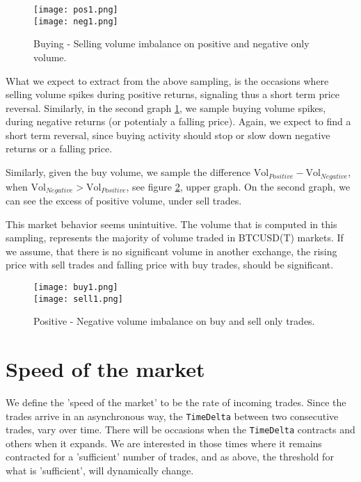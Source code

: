 \begin{figure}[H]
	\centering
    \texttt{[image: pos1.png]} \\
    \texttt{[image: neg1.png]}
	\caption{Buying - Selling volume imbalance on positive and negative only volume.}
    \label{fig:pos_neg}
\end{figure}

What we expect to extract from the above sampling, is the occasions where selling volume spikes during positive returns, signaling thus a short term price reversal. Similarly, in the second graph \ref{fig:pos_neg}, we sample buying volume spikes, during negative returns (or potentialy a falling price). Again, we expect to find a short term reversal, since buying activity should stop or slow down negative returns or a falling price.

Similarly, given the buy volume, we sample the difference  \(\text{Vol}_{Positive} - \text{Vol}_{Negative} \), when \(\text{Vol}_{Negative} > \text{Vol}_{Positive} \), see figure \ref{fig:buy_sell}, upper graph. On the second graph, we can see the excess of positive volume, under sell trades.

This market behavior seems unintuitive. The volume that is computed in this sampling, represents the majority of volume traded in BTCUSD(T) markets. If we assume, that there is no significant volume in another exchange, the rising price with sell trades and falling price with buy trades, should be significant.

\begin{figure}[H]
	\centering
    \texttt{[image: buy1.png]} \\
    \texttt{[image: sell1.png]}
	\caption{Positive - Negative volume imbalance on buy and sell only trades.}
    \label{fig:buy_sell}
\end{figure}


\section{Speed of the market}

We define the 'speed of the market' to be the rate of incoming trades. Since the trades arrive in an asynchronous way, the \texttt{TimeDelta} between two consecutive trades, vary over time. There will be occasions when the \texttt{TimeDelta} contracts and others when it expands. We are interested in those times where it remains contracted for a 'sufficient' number of trades, and as above, the threshold for what is 'sufficient', will dynamically change.

